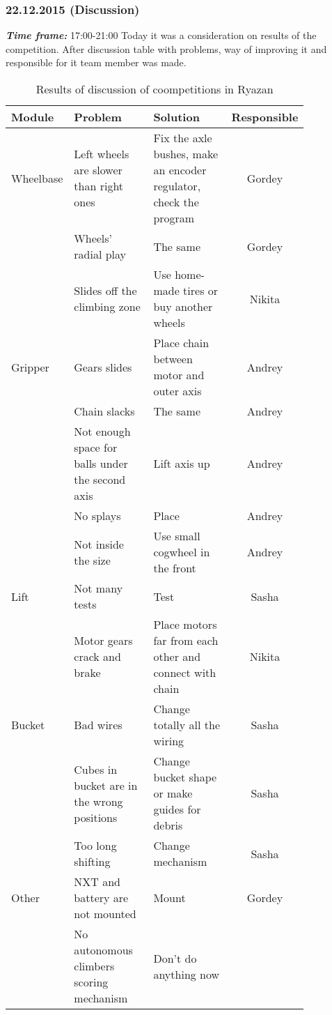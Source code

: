 \subsubsection{22.12.2015 (Discussion)}
\textit{\textbf{Time frame:}} 17:00-21:00 \newline
Today it was a consideration on results of the competition. After discussion table with problems, way of improving it and responsible for it team member was made.
\begin{table}[H]
	\caption{Results of discussion of coompetitions in Ryazan}
	\label{tabular:meetingRZN22.12}
	\begin{center}
		\begin{tabular}{|p{0.12\linewidth}|p{0.35\linewidth}|p{0.38\linewidth}|c|}
		  \hline
		  Module & Problem	& Solution	& Responsible \\
		  \hline
		  Wheelbase	& Left wheels are slower than right ones & Fix the axle bushes, make an encoder regulator, check the program & Gordey \\
		  & Wheels' radial play & The same & Gordey \\
		  & Slides off the climbing zone	& Use home-made tires or buy another wheels & Nikita \\
		  \hline
		  Gripper	& Gears slides	& Place chain between motor and outer axis & 	Andrey \\
		  & Chain slacks	& The same & Andrey \\	
		  & Not enough space for balls under the second axis	& Lift axis up	& Andrey \\
		  & No splays & Place & Andrey \\
		  & Not inside the size	& Use small cogwheel in the front & Andrey \\
		  \hline
		  Lift & Not many tests & Test & Sasha \\
		  & Motor gears crack and brake	& Place motors far from each other and connect with chain & Nikita \\
		  \hline
		  Bucket & Bad wires & Change totally all the wiring	& Sasha \\
		  & Cubes in bucket are in the wrong positions	& Change bucket shape or make guides for debris	& Sasha \\
		  & Too long shifting	& Change mechanism & Sasha \\
		  \hline
		  Other	& NXT and battery are not mounted & Mount & Gordey \\	
		  & No autonomous climbers scoring mechanism	& Don't do anything now & \\	
		  \hline
		  	
		\end{tabular}
	\end{center}
\end{table}


